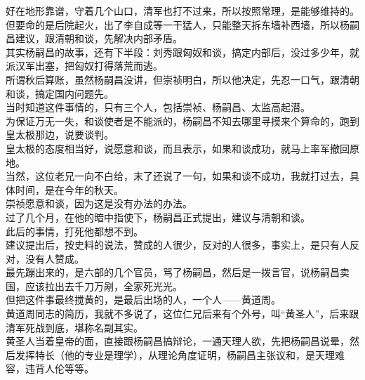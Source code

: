 \begin{multicols}{\theparacolNo}
好在地形靠谱，守着几个山口，清军也打不过来，所以按照常理，是能够维持的。\\

但要命的是后院起火，出了李自成等一干猛人，只能整天拆东墙补西墙，所以杨嗣昌建议，跟清朝和谈，先解决内部矛盾。\\

其实杨嗣昌的故事，还有下半段：刘秀跟匈奴和谈，搞定内部后，没过多少年，就派汉军出塞，把匈奴打得落荒而逃。\\

所谓秋后算账，虽然杨嗣昌没讲，但崇祯明白，所以他决定，先忍一口气，跟清朝和谈，搞定国内问题先。\\

当时知道这件事情的，只有三个人，包括崇祯、杨嗣昌、太监高起潜。\\

为保证万无一失，和谈使者是不能派的，杨嗣昌不知去哪里寻摸来个算命的，跑到皇太极那边，说要谈判。\\

皇太极的态度相当好，说愿意和谈，而且表示，如果和谈成功，就马上率军撤回原地。\\

当然，这位老兄一向不白给，末了还说了一句，如果和谈不成功，我就打过去，具体时间，是在今年的秋天。\\

崇祯愿意和谈，因为这是没有办法的办法。\\

过了几个月，在他的暗中指使下，杨嗣昌正式提出，建议与清朝和谈。\\

此后的事情，打死他都想不到。\\

建议提出后，按史料的说法，赞成的人很少，反对的人很多，事实上，是只有人反对，没有人赞成。\\

最先蹦出来的，是六部的几个官员，骂了杨嗣昌，然后是一拨言官，说杨嗣昌卖国，应该拉出去千刀万剐，全家死光光。\\

但把这件事最终搅黄的，是最后出场的人，一个人——黄道周。\\

黄道周同志的简历，我就不多说了，这位仁兄后来有个外号，叫“黄圣人”，后来跟清军死战到底，堪称名副其实。\\

黄圣人当着皇帝的面，直接跟杨嗣昌搞辩论，一通天理人欲，先把杨嗣昌说晕，然后发挥特长（他的专业是理学），从理论角度证明，杨嗣昌主张议和，是天理难容，违背人伦等等。\\


\end{multicols}
